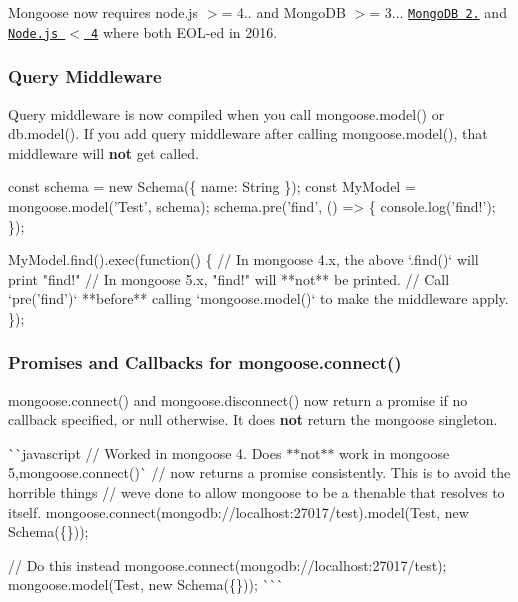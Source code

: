 Mongoose now requires node.\+js $>$= 4.. and Mongo\+DB $>$= 3... \href{https://www.mongodb.com/blog/post/mongodb-2-6-end-of-life}{\tt Mongo\+DB 2.} and \href{https://github.com/nodejs/Release}{\tt Node.\+js $<$ 4} where both E\+O\+L-\/ed in 2016.

\subsubsection*{Query Middleware}

Query middleware is now compiled when you call {\ttfamily mongoose.\+model()} or {\ttfamily db.\+model()}. If you add query middleware after calling {\ttfamily mongoose.\+model()}, that middleware will {\bfseries not} get called.


\begin{DoxyCode}
const schema = new Schema(\{ name: String \});
const MyModel = mongoose.model('Test', schema);
schema.pre('find', () => \{ console.log('find!'); \});

MyModel.find().exec(function() \{
  // In mongoose 4.x, the above `.find()` will print "find!"
  // In mongoose 5.x, "find!" will **not** be printed.
  // Call `pre('find')` **before** calling `mongoose.model()` to make the middleware apply.
\});
\end{DoxyCode}


\subsubsection*{Promises and Callbacks for {\ttfamily mongoose.\+connect()}}

{\ttfamily mongoose.\+connect()} and {\ttfamily mongoose.\+disconnect()} now return a promise if no callback specified, or {\ttfamily null} otherwise. It does {\bfseries not} return the mongoose singleton.

\`{}\`{}{\ttfamily javascript // Worked in mongoose 4. Does $\ast$$\ast$not$\ast$$\ast$ work in mongoose 5,}mongoose.\+connect()\`{} // now returns a promise consistently. This is to avoid the horrible things // we\textquotesingle{}ve done to allow mongoose to be a thenable that resolves to itself. mongoose.\+connect(\textquotesingle{}mongodb\+://localhost\+:27017/test\textquotesingle{}).model(\textquotesingle{}Test\textquotesingle{}, new Schema(\{\}));

// Do this instead mongoose.\+connect(\textquotesingle{}mongodb\+://localhost\+:27017/test\textquotesingle{}); mongoose.\+model(\textquotesingle{}Test\textquotesingle{}, new Schema(\{\})); \`{}\`{}\`{}

